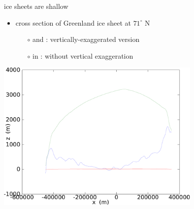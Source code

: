 \documentclass{beamer}
\begin{document}

\begin{frame}{ice sheets are shallow}

\vspace{-0.2in}
\small
\begin{itemize}
\item cross section of Greenland ice sheet at $71^\circ$ N
  \begin{itemize}
  \item[$\circ$] {\color{dark green}{green}} and {\color{dark blue}{blue}}: vertically-exaggerated version
  \item[$\circ$] in {\color{dark red}{red}}: without vertical exaggeration
  \end{itemize}
\end{itemize}
\normalsize

  \begin{center}
    \includegraphics[width=0.75\textwidth]{greentrans}
  \end{center}
\end{frame}
\end{document}
